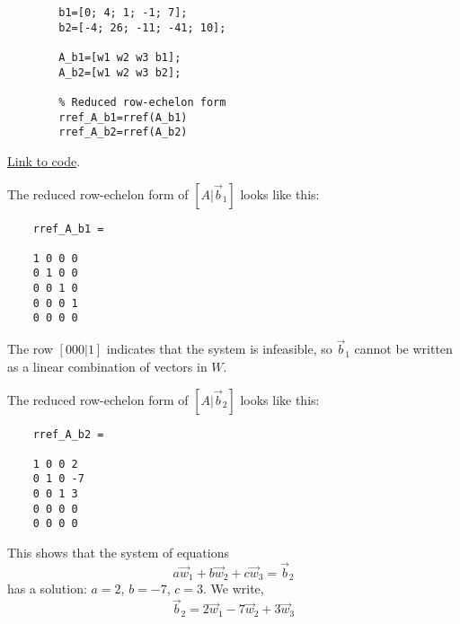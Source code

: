 \documentclass{ximera}
\begin{document}
\begin{example}
\begin{explanation}
\begin{verbatim}
        b1=[0; 4; 1; -1; 7];
        b2=[-4; 26; -11; -41; 10];

        A_b1=[w1 w2 w3 b1];
        A_b2=[w1 w2 w3 b2];

        % Reduced row-echelon form
        rref_A_b1=rref(A_b1)
        rref_A_b2=rref(A_b2)
    \end{verbatim}

\href{https://sagecell.sagemath.org/?z=eJxNkD9vgzAQxXckvsNbkBqpVLFJ08Fi6N6pSwdURfw5AhLgyjax-u17F9K0g63n37t7ti_DGwW8nhqFeulEaDSEej3PtATqMNfBjS15pEmGOFhPaO20zotH7QhhIFyoDdZ52B4fUhXsmZg7xDEMd_d2Q6Mf4ch_MR0vNH0_pUmaRFVWhcHR5Mpgb3D4NAx1WfEx1wbsPRuoKy3K6rfqZgpOk4YzNihNvF6ENxySM9NHgeIceFP7rUf-XVZRIWrEgp8oWGbwH-qtNsM7dWvLI3E25tQONNkFvXVzmjhH_ekaJupB1O6P6jvVux-ACGWM&lang=octave&interacts=eJyLjgUAARUAuQ==}{Link to code}.

The reduced row-echelon form of $[A | \vec{b}_1]$ looks like this:
\begin{verbatim}
    rref_A_b1 =

    1 0 0 0
    0 1 0 0
    0 0 1 0
    0 0 0 1
    0 0 0 0
\end{verbatim}

The row $[0 0 0 | 1]$ indicates that the system is infeasible, so $\vec{b}_1$ cannot be written as a linear combination of vectors in $W$.

The reduced row-echelon form of $[A | \vec{b}_2]$ looks like this:

\begin{verbatim}
    rref_A_b2 =

    1 0 0 2
    0 1 0 -7
    0 0 1 3
    0 0 0 0
    0 0 0 0
\end{verbatim}
This shows that the system of equations
$$a\vec{w}_1+b\vec{w}_2+c\vec{w}_3=\vec{b}_2$$
has a solution: $a=2$, $b=-7$, $c=3$.  We write,
$$\vec{b}_2=2\vec{w}_1-7\vec{w}_2+3\vec{w}_3$$
    \end{explanation}

\end{example}
\end{document}
